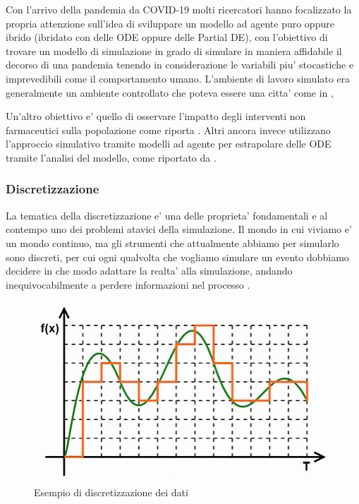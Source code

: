 Con l'arrivo della pandemia da COVID-19 molti ricercatori hanno 
focalizzato la propria attenzione sull'idea di sviluppare un modello 
ad agente puro oppure ibrido \cite{Marzban2021-pd}
(ibridato con delle ODE oppure delle Partial DE), con l'obiettivo di 
trovare un modello di simulazione in grado di simulare in maniera 
affidabile il decorso di una pandemia tenendo in considerazione le 
variabili piu' stocastiche e imprevedibili come il comportamento umano.
L'ambiente di lavoro simulato era generalmente un ambiente controllato
che poteva essere una citta' come in \cite{PRAJAPATI20232299}, 

Un'altro obiettivo e' quello di osservare l'impatto degli interventi non 
farmaceutici sulla popolazione come riporta \cite{NOVAKOVIC2022108790}
\cite{10.1371/journal.pcbi.1009149}.
Altri ancora invece utilizzano l'approccio simulativo tramite modelli ad 
agente per estrapolare delle ODE tramite l'analisi del modello, come
riportato da \cite{Nardini2021-pu}. 

\subsubsection{Discretizzazione}
La tematica della discretizzazione e' una delle proprieta' fondamentali
e al contempo uno dei problemi atavici della simulazione.
Il mondo in cui viviamo e' un mondo continuo, ma gli strumenti
che attualmente abbiamo per simularlo sono discreti, per cui 
ogni qualvolta che vogliamo simulare un evento dobbiamo decidere 
in che modo adattare la realta' alla simulazione, andando 
inequivocabilmente a perdere informazioni nel processo 
\cite{KONSTANTINOUDIS2020100319}. 

\begin{figure}[h]
    \begin{center}
        \includegraphics[width=\linewidth]{img/figura-1-analogico-e-digitale-7ae2c4b25c8751e9a3771f91f1e65bb1f.jpg}
        \caption{Esempio di discretizzazione dei dati}
        \label{fig:discretization}
    \end{center}
\end{figure}

